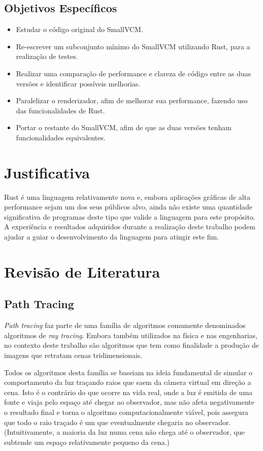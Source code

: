 \documentclass[12pt]{article}
\begin{document}
\subsection{Objetivos Específicos}
\begin{itemize}
	\item Estudar o código original do SmallVCM.
	\item Re-escrever um subconjunto mínimo do SmallVCM utilizando Rust, para a realização de
		testes.
	\item Realizar uma comparação de performance e clareza de código entre as duas versões e
		identificar possíveis melhorias.
	\item Paralelizar o renderizador, afim de melhorar sua performance, fazendo uso das
		funcionalidades de Rust.
	\item Portar o restante do SmallVCM, afim de que as duas versões tenham funcionalidades
		equivalentes.
\end{itemize}

\section{Justificativa}

Rust é uma linguagem relativamente nova e, embora aplicações gráficas de alta performance sejam um
dos seus públicos alvo, ainda não existe uma quantidade significativa de programas deste tipo que
valide a linguagem para este propósito. A experiência e resultados adquiridos durante a realização
deste trabalho podem ajudar a guiar o desenvolvimento da linguagem para atingir este fim.

\section{Revisão de Literatura}

\subsection{Path Tracing}

\emph{Path tracing} faz parte de uma família de algoritmos comumente denominados algoritmos de
\emph{ray tracing}. Embora também utilizados na física e nas engenharias, no contexto deste trabalho
são algoritmos que tem como finalidade a produção de imagens que retratam cenas tridimensionais.

Todos os algoritmos desta família se baseiam na ideia fundamental de simular o comportamento da luz
traçando raios que saem da câmera virtual em direção a cena. Isto é o contrário do que ocorre na
vida real, onde a luz é emitida de uma fonte e viaja pelo espaço até chegar ao observador, mas não
afeta negativamente o resultado final e torna o algoritmo computacionalmente viável, pois assegura
que todo o raio traçado é um que eventualmente chegaria no observador. (Intuitivamente, a maioria da
luz numa cena não chega até o observador, que subtende um espaço relativamente pequeno da
cena.)\citep{pharr2010}
\end{document}
